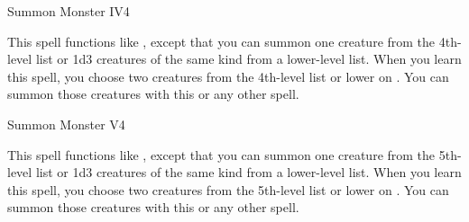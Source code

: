\begin{spellsection}{Summon Monster IV}{4}
    \begin{spellheader}
    \end{spellheader}
    \begin{spellcontent}
        \begin{spelltargetinginfo}
        \end{spelltargetinginfo}
        \begin{spelleffects}
            \spellspecial This spell functions like , except that you can summon one creature from the 4th-level list or 1d3 creatures of the same kind from a lower-level list. When you learn this spell, you choose two creatures from the 4th-level list or lower on . You can summon those creatures with this or any other  spell.
            \spelldur \durshort \dismissable
        \end{spelleffects}
    \end{spellcontent}
    \begin{spellfooter}
        \miscastexplode
    \end{spellfooter}
\end{spellsection}

\begin{spellsection}{Summon Monster V}{4}
    \begin{spellheader}
    \end{spellheader}
    \begin{spellcontent}
        \begin{spelltargetinginfo}
        \end{spelltargetinginfo}
        \begin{spelleffects}
            \spellspecial This spell functions like , except that you can summon one creature from the 5th-level list or 1d3 creatures of the same kind from a lower-level list. When you learn this spell, you choose two creatures from the 5th-level list or lower on . You can summon those creatures with this or any other  spell.
            \spelldur \durshort \dismissable
        \end{spelleffects}
    \end{spellcontent}
    \begin{spellfooter}
        \miscastexplode
    \end{spellfooter}
\end{spellsection}

